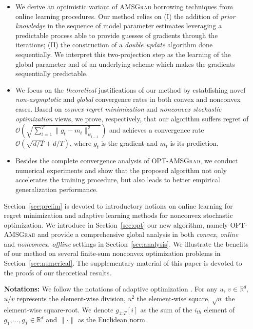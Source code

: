\documentclass[wcp]{jmlr}
\begin{document}
\begin{itemize}
\item We derive an optimistic variant of \textsc{AMSGrad} borrowing techniques from online learning procedures. Our method relies on \textsf{(I)} the addition of \emph{prior knowledge} in the sequence of model parameter estimates leveraging a predictable process able to provide guesses of gradients through the iterations; \textsf{(II)} the construction of a \emph{double update} algorithm done sequentially. We interpret this two-projection step as the learning of the global parameter and of an underlying scheme which makes the gradients sequentially predictable.
\item We focus on the  \emph{theoretical} justifications of our method by establishing novel \emph{non-asymptotic} and \emph{global} convergence rates in both convex and nonconvex cases.  Based on \emph{convex regret minimization} and \emph{nonconvex stochastic optimization} views, we prove, respectively, that our algorithm suffers regret of $\mathcal{O}(\sqrt{\sum_{t=1}^T \| g_t - m_t  \|^2_{\psi_{t-1}}})$ and achieves a convergence rate $\mathcal{O}(\sqrt{d/T} +d/T )$, where $g_t$ is the gradient and $m_t$ is its prediction.
\item Besides the complete convergence analysis of \textsc{OPT-AMSGrad}, we conduct numerical experiments and show that the proposed algorithm not only accelerates the training procedure, but also leads to better empirical generalization performance.
\end{itemize}

Section~\ref{sec:prelim} is devoted to introductory notions on online learning for regret minimization and adaptive learning methods for nonconvex stochastic optimization. We introduce in Section~\ref{sec:opt} our new algorithm, namely \textsc{OPT-AMSGrad} and provide a comprehensive global analysis in both \emph{convex}, \emph{online}  and \emph{nonconvex}, \emph{offline} settings in Section~\ref{sec:analysis}.
We illustrate the benefits of our method on several finite-sum nonconvex optimization problems in Section~\ref{sec:numerical}.
The supplementary material of this paper is devoted to the proofs of our theoretical results.

\textbf{Notations:} 
We follow the notations of adaptive optimization \citep{KB15,RKK18}. 
For any $u$, $v \in \mathbb R^{d}$,  $u/v$ represents the element-wise division,
$u^{2}$ the element-wise square, $\sqrt{u}$ the element-wise square-root.
We denote $g_{1:T}[i]$ as the sum of the $i_{th}$ element of $g_{1},\dots, g_{T} \in \mathbb R^{d}$ and $\| \cdot \|$ as the Euclidean norm.
\end{document}
